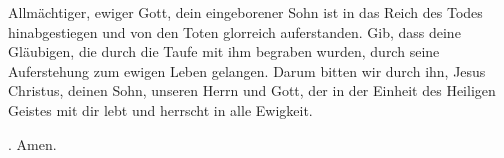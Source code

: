 \lettrine[lines=3]{A}{}llmächtiger, ewiger Gott, dein eingeborener Sohn ist in das Reich des Todes hinabgestiegen und von den Toten glorreich auferstanden. Gib, dass deine Gläubigen, die durch die Taufe mit ihm begraben wurden, durch seine Auferstehung zum ewigen Leben gelangen. Darum bitten wir durch ihn, Jesus Christus, deinen Sohn, unseren Herrn und Gott, der in der Einheit des Heiligen Geistes mit dir lebt und herrscht in alle Ewigkeit.
\par \Rbar. Amen.
